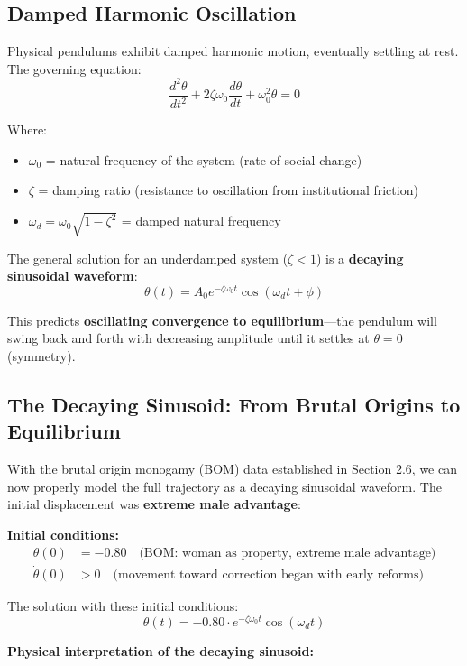 \documentclass[12pt,openany]{book}
\numberwithin{equation}{chapter}
\begin{document}
\subsection{Damped Harmonic Oscillation}

Physical pendulums exhibit damped harmonic motion, eventually settling at rest. The governing equation:
\[
\frac{d^2\theta}{dt^2} + 2\zeta\omega_0\frac{d\theta}{dt} + \omega_0^2\theta = 0
\]

Where:
\begin{itemize}
    \item $\omega_0$ = natural frequency of the system (rate of social change)
    \item $\zeta$ = damping ratio (resistance to oscillation from institutional friction)
    \item $\omega_d = \omega_0\sqrt{1-\zeta^2}$ = damped natural frequency
\end{itemize}

The general solution for an underdamped system ($\zeta < 1$) is a \textbf{decaying sinusoidal waveform}:
\[
\theta(t) = A_0 e^{-\zeta\omega_0 t} \cos(\omega_d t + \phi)
\]

This predicts \textbf{oscillating convergence to equilibrium}---the pendulum will swing back and forth with decreasing amplitude until it settles at $\theta = 0$ (symmetry).

\subsection{The Decaying Sinusoid: From Brutal Origins to Equilibrium}

With the brutal origin monogamy (BOM) data established in Section 2.6, we can now properly model the full trajectory as a decaying sinusoidal waveform. The initial displacement was \textbf{extreme male advantage}:

\textbf{Initial conditions:}
\begin{align*}
\theta(0) &= -0.80 \quad \text{(BOM: woman as property, extreme male advantage)} \\
\dot{\theta}(0) &> 0 \quad \text{(movement toward correction began with early reforms)}
\end{align*}

The solution with these initial conditions:
\[
\theta(t) = -0.80 \cdot e^{-\zeta\omega_0 t} \cos(\omega_d t)
\]

\textbf{Physical interpretation of the decaying sinusoid:}
\end{document}
